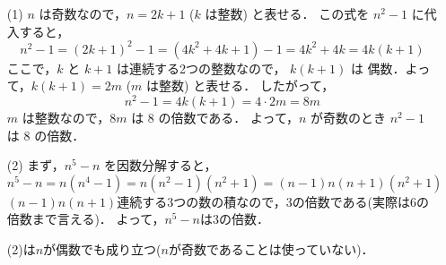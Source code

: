 \documentclass[a4paper,11pt]{ltjsarticle}
\begin{document}
\begin{itemize}
    \item [(1)]$n$ は奇数なので，$n=2k+1$ ($k$ は整数) と表せる．
この式を $n^2-1$ に代入すると，
\[n^2-1 = (2k+1)^2-1 = (4k^2+4k+1)-1 = 4k^2+4k = 4k(k+1)\]
ここで，$k$ と $k+1$ は連続する2つの整数なので， $k(k+1)$ は 偶数．よって，$k(k+1)=2m$ ($m$ は整数) と表せる．
したがって，
\[n^2-1 = 4k(k+1) = 4\cdot2m= 8m\]
$m$ は整数なので，$8m$ は $8$ の倍数である．
よって，$n$ が奇数のとき $n^2-1$ は $8$ の倍数．

    \item [(2)]まず，$n^5-n$ を因数分解すると，
\[n^5-n = n(n^4-1) = n(n^2-1)(n^2+1) = (n-1)n(n+1)(n^2+1)\]
$(n-1)n(n+1)$連続する3つの数の積なので，3の倍数である(実際は6の倍数まで言える)．
よって，$n^5-n$は3の倍数．
\begin{rembox}
 (2)は$n$が偶数でも成り立つ($n$が奇数であることは使っていない)．
\end{rembox}
\end{itemize}
\end{document}
